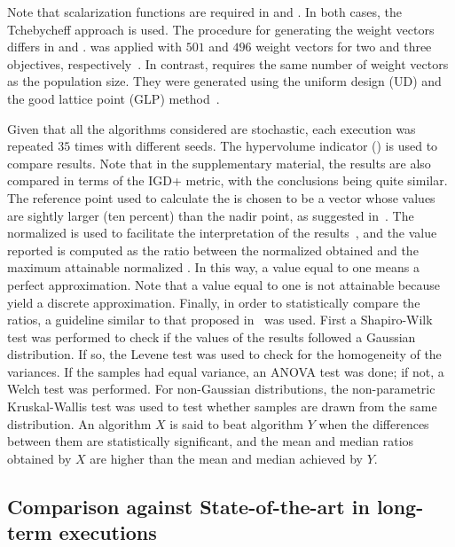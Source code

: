 %
Note that scalarization functions are required in \MOEAD{} and \RMOEA{}.
%
In both cases, the Tchebycheff approach is used.
%
The procedure for generating the weight vectors differs in \MOEAD{} and \RMOEA{}.
%
\RMOEA{} was applied with $501$ and $496$ weight vectors for two and three objectives, respectively~\citep{trautmann2013r2}.
%
In contrast, \MOEAD{} requires the same number of weight vectors as the population size.
%
They were generated using the uniform design (UD) and the good lattice point (GLP) method~\citep{Joel:MOEAD_Uniform_Design, Joel:Kuhn_Munkres}.

Given that all the algorithms considered are stochastic, each execution was repeated $35$ times with different seeds.
%
The hypervolume indicator (\HV{}) is used to compare results.
%
Note that in the supplementary material, the results are also compared in terms of the IGD+ metric, with the conclusions being quite similar.
%
The reference point used to calculate the \HV{} is chosen to be a vector whose values are sightly larger (ten percent) than the nadir point, 
as suggested in~\cite{ishibuchi2017reference}.
%
The normalized \HV{} is used to facilitate the interpretation of the results~\citep{li2015evolutionary},
and the value reported is computed as the ratio between the normalized \HV{} obtained and the maximum attainable 
normalized \HV{}.
%
In this way, a value equal to one means a perfect approximation.
%
Note that a value equal to one is not attainable because \MOEAS{} yield a discrete approximation.
%
Finally, in order to statistically compare the \HV{} ratios, a guideline similar to that proposed in~\cite{Joel:StatisticalTest} was used. 
%
First a Shapiro-Wilk test was performed to check if the values of the results followed a Gaussian distribution. 
%
If so, the Levene test was used to check for the homogeneity of the variances. 
%
If the samples had equal variance, an ANOVA test was done; if not, a Welch test was performed. 
%
For non-Gaussian distributions, the non-parametric Kruskal-Wallis test was used to test whether samples are drawn from the same distribution. 
%
An algorithm $X$ is said to beat algorithm $Y$ when the differences between them are statistically significant, and the mean and median \HV{} ratios 
obtained by $X$ are higher than the mean and median achieved by $Y$.

%

\subsection{Comparison against State-of-the-art \MOEAS{} in long-term executions}

